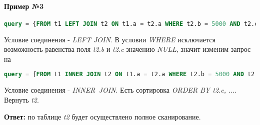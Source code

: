 \paragraph{Пример №3}
\begin{lstlisting}[language=SQL]
query = {FROM t1 LEFT JOIN t2 ON t1.a = t2.a WHERE t2.b = 5000 AND t2.c > 3 ORDER BY t2.c, t2.d}
\end{lstlisting}

Условие соединения - \textit{LEFT JOIN}. В условии \textit{WHERE} исключается возможность равенства поля \textit{t2.b} и \textit{t2.c} значению \textit{NULL}, значит изменим запрос на
\begin{lstlisting}[language=SQL]
query = {FROM t1 INNER JOIN t2 ON t1.a = t2.a WHERE t2.b = 5000 AND t2.c > 3 ORDER BY t2.c, t2.d}
\end{lstlisting}

Условие соединения - \textit{INNER JOIN}. Есть сортировка \textit{ORDER BY t2.c, $\ldots$}. Вернуть \textit{t2}.

\textbf{Ответ:} по таблице \textit{t2} будет осуществлено полное сканирование. 